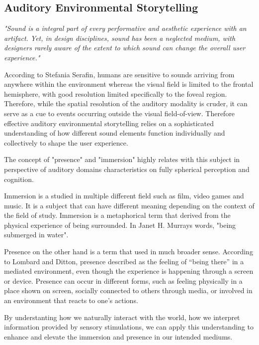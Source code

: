         \subsection{Auditory Environmental Storytelling}
            \emph{"Sound is a integral part of every performative and aesthetic experience with an artifact. Yet, in design disciplines, sound has been a neglected medium, with designers rarely aware of the extent to which sound can change the overall user experience."\cite{Sonic_Interaction_Design}}

            According to Stefania Serafin, humans are sensitive to sounds arriving from anywhere within the environment whereas the visual field is limited to the frontal hemisphere, with good resolution limited specifically to the foveal region. Therefore, while the spatial resolution of the auditory modality is cruder, it can serve as a cue to events occurring outside the visual field-of-view\cite{Sonic_Interaction_in_Virtual_Environments}. Therefore effective auditory environmental storytelling relies on a sophisticated understanding of how different sound elements function individually and collectively to shape the user experience.\par

            The concept of "presence" and "immersion" highly relates with this subject in perspective of auditory domains characteristics on fully spherical perception and cognition.\par

            Immersion is a studied in multiple different field such as film, video games and music. It is a subject that can have different meaning depending on the context of the field of study\cite{Sonic_Interaction_in_Virtual_Environments}. Immersion is a metaphorical term that derived from the physical experience of being surrounded. In Janet H. Murrays words, "being submerged in water"\cite{Hamlet_on_the_Holodeck}. 

            Presence on the other hand is a term that used in much broader sense. According to Lombard and Ditton, presence described as the feeling of “being there” in a mediated environment, even though the experience is happening through a screen or device. Presence can occur in different forms, such as feeling physically in a place shown on screen, socially connected to others through media, or involved in an environment that reacts to one’s actions\cite{Concept_of_Presence}.

            By understanting how we naturally interact with the world, how we interpret information provided by sensory stimulations, we can apply this understanding to enhance and elevate the immersion and presence in our intended mediums.\par

